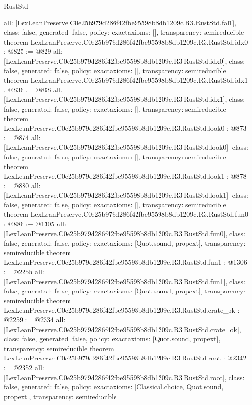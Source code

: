 \begin{lexlean}{RustStd}
\begin{coremodule}
{  all: [LexLeanPreserve.C0e25b979d286f42fbe95598b8db1209c.R3.RustStd.fal1],
  class: false,
  generated: false,
  policy: exact{axioms: []},
  transparency: semireducible
}
theorem LexLeanPreserve.C0e25b979d286f42fbe95598b8db1209c.R3.RustStd.idx0 : @825 := @829 {
  all: [LexLeanPreserve.C0e25b979d286f42fbe95598b8db1209c.R3.RustStd.idx0],
  class: false,
  generated: false,
  policy: exact{axioms: []},
  transparency: semireducible
}
theorem LexLeanPreserve.C0e25b979d286f42fbe95598b8db1209c.R3.RustStd.idx1 : @836 := @868 {
  all: [LexLeanPreserve.C0e25b979d286f42fbe95598b8db1209c.R3.RustStd.idx1],
  class: false,
  generated: false,
  policy: exact{axioms: []},
  transparency: semireducible
}
theorem LexLeanPreserve.C0e25b979d286f42fbe95598b8db1209c.R3.RustStd.look0 : @873 := @874 {
  all: [LexLeanPreserve.C0e25b979d286f42fbe95598b8db1209c.R3.RustStd.look0],
  class: false,
  generated: false,
  policy: exact{axioms: []},
  transparency: semireducible
}
theorem LexLeanPreserve.C0e25b979d286f42fbe95598b8db1209c.R3.RustStd.look1 : @878 := @880 {
  all: [LexLeanPreserve.C0e25b979d286f42fbe95598b8db1209c.R3.RustStd.look1],
  class: false,
  generated: false,
  policy: exact{axioms: []},
  transparency: semireducible
}
theorem LexLeanPreserve.C0e25b979d286f42fbe95598b8db1209c.R3.RustStd.fun0 : @886 := @1305 {
  all: [LexLeanPreserve.C0e25b979d286f42fbe95598b8db1209c.R3.RustStd.fun0],
  class: false,
  generated: false,
  policy: exact{axioms: [Quot.sound, propext]},
  transparency: semireducible
}
theorem LexLeanPreserve.C0e25b979d286f42fbe95598b8db1209c.R3.RustStd.fun1 : @1306 := @2255 {
  all: [LexLeanPreserve.C0e25b979d286f42fbe95598b8db1209c.R3.RustStd.fun1],
  class: false,
  generated: false,
  policy: exact{axioms: [Quot.sound, propext]},
  transparency: semireducible
}
theorem LexLeanPreserve.C0e25b979d286f42fbe95598b8db1209c.R3.RustStd.crate_ok : @2259 := @2334 {
  all: [LexLeanPreserve.C0e25b979d286f42fbe95598b8db1209c.R3.RustStd.crate_ok],
  class: false,
  generated: false,
  policy: exact{axioms: [Quot.sound, propext]},
  transparency: semireducible
}
theorem LexLeanPreserve.C0e25b979d286f42fbe95598b8db1209c.R3.RustStd.root : @2342 := @2352 {
  all: [LexLeanPreserve.C0e25b979d286f42fbe95598b8db1209c.R3.RustStd.root],
  class: false,
  generated: false,
  policy: exact{axioms: [Classical.choice, Quot.sound, propext]},
  transparency: semireducible
}


\end{coremodule}
\end{lexlean}
